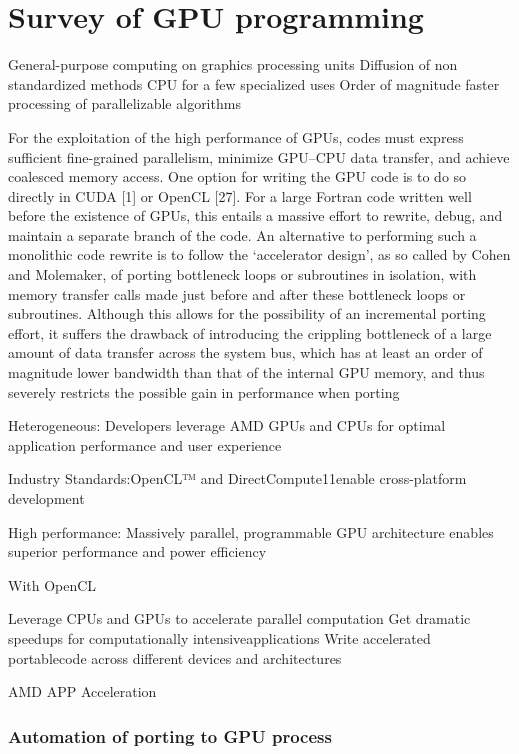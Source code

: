 \chapter{Survey of GPU programming}

General-purpose computing on graphics processing units 	Diffusion of non standardized methods 	CPU for a few specialized uses 	Order of magnitude faster processing of parallelizable algorithms

For the exploitation of the high performance of GPUs, codes must express sufficient fine-grained parallelism, minimize GPU–CPU data transfer, and achieve coalesced memory access. One option for writing the GPU code is to do so directly in CUDA [1] or OpenCL [27]. For a large Fortran code written well before the existence of GPUs, this entails a massive effort to rewrite, debug, and maintain a separate branch of the code. An alternative to performing such a monolithic code rewrite is to follow the ‘accelerator design’, as so called by Cohen and Molemaker, of porting bottleneck loops or subroutines in isolation, with memory transfer calls made just before and after these bottleneck loops or subroutines. Although this allows for the possibility of an incremental porting effort, it suffers the drawback of introducing the crippling bottleneck of a large amount of data transfer across the system bus, which has at least an order of magnitude lower bandwidth than that of the internal GPU memory, and thus severely restricts the possible gain in performance when porting

Heterogeneous: Developers leverage AMD GPUs and CPUs for optimal application performance and user experience

Industry Standards:OpenCL™ and DirectCompute11enable cross-platform development

High performance: Massively parallel, programmable GPU architecture enables superior performance and power efficiency

With OpenCL

Leverage CPUs and GPUs to accelerate parallel computation
Get dramatic speedups for computationally intensiveapplications
Write accelerated portablecode across different devices and architectures


AMD APP Acceleration 


\subsection{Automation of porting to GPU process}

